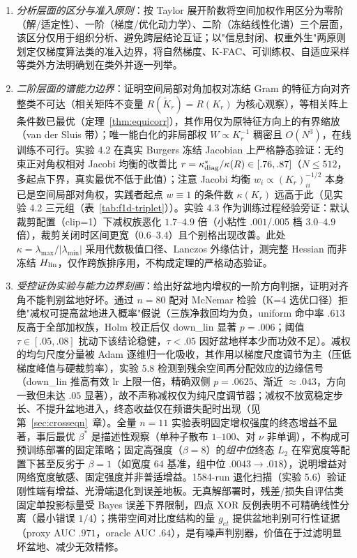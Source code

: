 \documentclass[fontset=windows,11pt]{ctexart}
\newcommand{\W}{W}
\numberwithin{equation}{section}
\begin{document}
\begin{enumerate}[label=(\arabic*),leftmargin=2em,itemsep=2pt]
\item \emph{分析层面的区分与准入原则}：按 Taylor 展开阶数将空间加权作用区分为零阶（解/适定性）、一阶（梯度/优化动力学）、二阶（冻结线性化谱）三个层面，该区分仅用于组织分析、避免跨层结论互证；以"信息封闭、权重外生"两原则划定仅梯度算法类的准入边界，将自然梯度、K-FAC、可训练权、自适应采样等类外方法明确划在类外并逐一列举。
\item \emph{二阶层面的谱能力边界}：证明空间局部对角加权对冻结 Gram 的特征方向对齐整类不可达（相关矩阵不变量 $R(\tilde K_r)=R(K_r)$ 为核心观察），等相关阵上条件数已最优（定理~\ref{thm:equicorr}），其作用仅为原特征方向上的有界缩放（van der Sluis 带）；唯一能白化的非局部权 $\W\propto K_r^{-1}$ 稠密且 $O(N^3)$，在线训练不可行。实验 4.2 在真实 Burgers 冻结 Jacobian 上严格静态验证：无约束正对角权相对 Jacobi 均衡的改善比 $r=\kappa^*_{\rm diag}/\kappa(R)\in[.76,.87]$（$N\le512$，多起点下界，真实最优不低于此值）；注意 Jacobi 均衡 $w_i\propto(K_r)_{ii}^{-1/2}$ 本身已是空间局部对角权，实践者起点 $w\equiv1$ 的条件数 $\kappa(K_r)$ 远高于此（见实验 4.2 三元组（表~\ref{tab:f1d-triplet}））。实验 4.3 作为训练过程经验旁证：默认裁剪配置（clip=1）下减权族恶化 $1.7$--$4.9$ 倍（小粘性 $.001$/.005 档 $3.0$--$4.9$ 倍），裁剪关闭时区间更宽（$0.6$--$3.4$）且个别格出现改善。此处 $\kappa=\lambda_{\max}/|\lambda_{\min}|$ 采用代数极值口径、Lanczos 外缘估计，测完整 Hessian 而非冻结 $H_{\rm lin}$，仅作跨族排序用，不构成定理的严格动态验证。
\item \emph{受控证伪实验与能力边界刻画}：给出好盆地内增权的一阶方向判据，证明对齐角不能判别盆地好坏。通过 $n=80$ 配对 McNemar 检验（K=4 选优口径）拒绝"减权可提高盆地进入概率"假说（三族净救回均为负，uniform 命中率 $.613$ 反高于全部加权族，Holm 校正后仅 down\_lin 显著 $p=.006$；阈值 $\tau\in[.05,.08]$ 扰动下该结论稳健，$\tau<.05$ 因好盆地样本少而功效不足）。减权的均匀尺度分量被 Adam 逐维归一化吸收，其作用以梯度尺度调节为主（压低梯度峰值与硬裁剪率），实验 5.8 检测到残余空间再分配效应的边缘信号（down\_lin 推高有效 lr 上限一倍，精确双侧 $p=.0625$、渐近 $\approx.043$，方向一致但未达 $.05$ 显著），故不声称减权仅为纯尺度调节器；减权不放宽稳定步长、不提升盆地进入，终态收益仅在频谱失配时出现（见第~\ref{sec:crosseqn}~章）。全量 $n=11$ 实验表明固定增权强度的终态增益不显著，事后最优 $\beta^*$ 是描述性观察（单种子散布 $1$--$100$、对 $\nu$ 非单调），不构成可预训练部署的固定策略；固定高强度（$\beta=8$）的\emph{组中位}终态 $L_2$ 在窄宽度等配置下甚至反劣于 $\beta=1$（如宽度 $64$ 基准，组中位 $.0043\to.018$），说明增益对网络宽度敏感、固定强度并非普适增益。1584-run 退化扫描（实验 5.6）验证刚性端有增益、光滑端退化到误差地板。无真解部署时，残差/损失自评估类固定单投影标量受 Bayes 误差下界限制，四点 XOR 反例表明不可精确线性分离（最小错误 $1/4$）；携带空间对比度结构的量 $g_{et}$ 提供盆地判别可行性证据（proxy AUC $.971$，oracle AUC $.64$），是有噪声判别器，价值在于过滤明显坏盆地、减少无效精修。
\end{enumerate}
\end{document}
